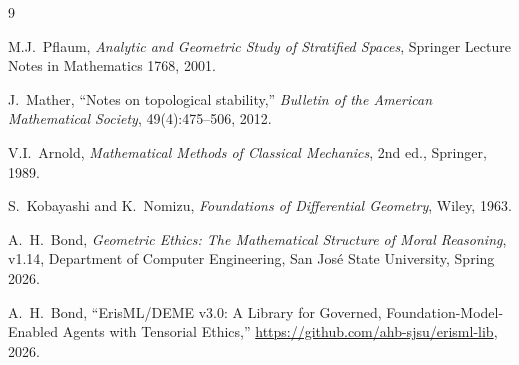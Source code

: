 \documentclass[11pt,a4paper]{article}
\begin{document}
\begin{thebibliography}{9}

M.J.\ Pflaum, \textit{Analytic and Geometric Study of Stratified Spaces}, Springer Lecture Notes in Mathematics 1768, 2001.

J.\ Mather, ``Notes on topological stability,'' \textit{Bulletin of the American Mathematical Society}, 49(4):475--506, 2012.

V.I.\ Arnold, \textit{Mathematical Methods of Classical Mechanics}, 2nd ed., Springer, 1989.

S.\ Kobayashi and K.\ Nomizu, \textit{Foundations of Differential Geometry}, Wiley, 1963.

A.~H.~Bond, \emph{Geometric Ethics: The Mathematical Structure of Moral Reasoning}, v1.14, Department of Computer Engineering, San Jos\'e State University, Spring 2026.

A.~H.~Bond, ``ErisML/DEME v3.0: A Library for Governed, Foundation-Model-Enabled Agents with Tensorial Ethics,'' \url{https://github.com/ahb-sjsu/erisml-lib}, 2026.

\end{thebibliography}
\end{document}

